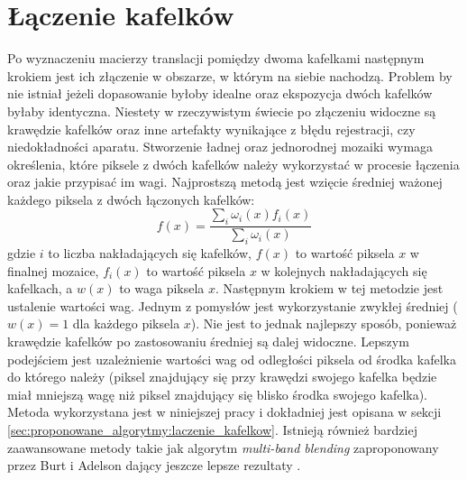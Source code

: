 \section{Łączenie kafelków}
\label{sec:algorytmy_korejestracji:laczenie_kafelkow}

Po wyznaczeniu macierzy translacji pomiędzy dwoma kafelkami następnym krokiem jest ich złączenie w obszarze, w którym na siebie nachodzą. Problem by nie istniał jeżeli dopasowanie byłoby idealne oraz ekspozycja dwóch kafelków byłaby identyczna. Niestety w rzeczywistym świecie po złączeniu widoczne są krawędzie kafelków oraz inne artefakty wynikające z błędu rejestracji, czy niedokładności aparatu. Stworzenie ładnej oraz jednorodnej mozaiki wymaga określenia, które piksele z dwóch kafelków należy wykorzystać w procesie łączenia oraz jakie przypisać im wagi. Najprostszą metodą jest wzięcie średniej ważonej każdego piksela z dwóch łączonych kafelków:
\begin{equation}
f(x)=\frac{\sum_{i}\omega_{i}(x)f_{i}(x)}{\sum_{i}\omega_{i}(x)}
\label{eq:blending}
\end{equation}
gdzie $i$ to liczba nakładających się kafelków, $f(x)$ to wartość piksela $x$ w finalnej mozaice, $f_{i}(x)$ to wartość piksela $x$ w kolejnych nakładających się kafelkach, a $w(x)$ to waga piksela $x$. Następnym krokiem w tej metodzie jest ustalenie wartości wag. Jednym z pomysłów jest wykorzystanie zwykłej średniej ($w(x)=1$ dla każdego piksela $x$). Nie jest to jednak najlepszy sposób, ponieważ krawędzie kafelków po zastosowaniu średniej są dalej widoczne. Lepszym podejściem jest uzależnienie wartości wag od odległości piksela od środka kafelka do którego należy (piksel znajdujący się przy krawędzi swojego kafelka będzie miał mniejszą wagę niż piksel znajdujący się blisko środka swojego kafelka). Metoda wykorzystana jest w niniejszej pracy i dokładniej jest opisana w sekcji \ref{sec:proponowane_algorytmy:laczenie_kafelkow}. Istnieją również bardziej zaawansowane metody takie jak algorytm \textit{multi-band blending} zaproponowany przez Burt i Adelson \cite{Burt:1983:MSA:245.247} dający jeszcze lepsze rezultaty \cite{Brown:2007:API:1265138.1265141}.

















